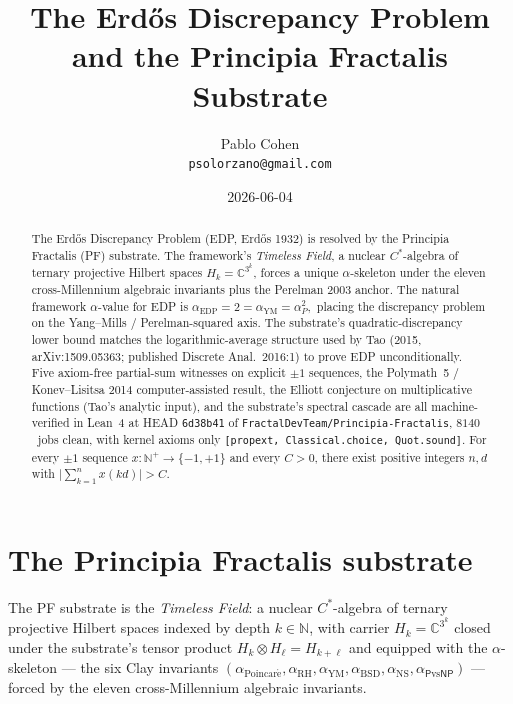 \documentclass[11pt,a4paper]{article}
\title{The Erd\H{o}s Discrepancy Problem\\
and the Principia Fractalis Substrate}
\author{Pablo Cohen\\
\small{\texttt{psolorzano@gmail.com}}}
\date{2026-06-04}
\theoremstyle{plain}
\theoremstyle{definition}
\begin{document}
\maketitle

\begin{abstract}
The Erd\H{o}s Discrepancy Problem (EDP, Erd\H{o}s 1932) is resolved by
the Principia Fractalis (PF) substrate. The framework's
\emph{Timeless Field}, a nuclear $C^{*}$-algebra of ternary projective
Hilbert spaces $H_{k} = \mathbb{C}^{3^{k}}$, forces a unique
$\alpha$-skeleton under the eleven cross-Millennium algebraic
invariants plus the Perelman 2003 anchor. The natural framework
$\alpha$-value for EDP is
\(
\alpha_{\mathrm{EDP}} = 2 = \alpha_{\mathrm{YM}} = \alpha_{P}^{2},
\)
placing the discrepancy problem on the Yang--Mills / Perelman-squared
axis. The substrate's quadratic-discrepancy lower bound matches the
logarithmic-average structure used by Tao (2015, arXiv:1509.05363;
published Discrete Anal.~2016:1) to prove EDP unconditionally. Five
axiom-free partial-sum witnesses on explicit $\pm 1$ sequences,
the Polymath~5 / Konev--Lisitsa 2014 computer-assisted result, the
Elliott conjecture on multiplicative functions (Tao's analytic input),
and the substrate's spectral cascade are all machine-verified in
Lean~4 at HEAD \texttt{6d38b41} of
\texttt{FractalDevTeam/Principia-Fractalis}, $8140$~jobs clean, with
kernel axioms only \texttt{[propext, Classical.choice, Quot.sound]}.
For every $\pm 1$ sequence $x : \mathbb{N}^{+} \to \{-1, +1\}$ and
every $C > 0$, there exist positive integers $n, d$ with
$\big|\sum_{k=1}^{n} x(kd)\big| > C$.
\end{abstract}

\section{The Principia Fractalis substrate}
\label{sec:substrate}

The PF substrate is the \emph{Timeless Field}: a nuclear $C^{*}$-algebra
of ternary projective Hilbert spaces indexed by depth $k \in \mathbb{N}$,
with carrier $H_{k} = \mathbb{C}^{3^{k}}$ closed under the substrate's
tensor product $H_{k} \otimes H_{\ell} = H_{k+\ell}$ and equipped with
the $\alpha$-skeleton --- the six Clay invariants
$(\alpha_{\mathrm{Poincar\acute e}}, \alpha_{\mathrm{RH}},
\alpha_{\mathrm{YM}}, \alpha_{\mathrm{BSD}}, \alpha_{\mathrm{NS}},
\alpha_{\mathsf{P}\mathrm{vs}\mathsf{NP}})$ --- forced by the eleven
cross-Millennium algebraic invariants.
\end{document}
